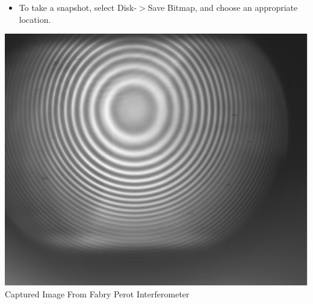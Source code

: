 \documentclass{../lab}
\begin{document}
\begin{enumerate}
\begin{itemize}
\begin{itemize}
\begin{enumerate}
                \begin{itemize}
                    \item To take a snapshot, select Disk-$>$Save Bitmap, and choose an appropriate location.
                \end{itemize}
            
            \end{enumerate}

        \end{itemize}
        
    \end{itemize}
    \begin{center}
        \href{http://experimentationlab.berkeley.edu/sites/default/files/images/Atmimage031.gif}{\includegraphics[width=0.6\linewidth]{images/Atmimage031.png}} \\
        Captured Image From Fabry Perot Interferometer
    \end{center}
    

\end{enumerate}
\end{document}
